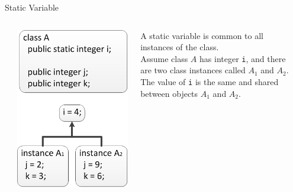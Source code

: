 \documentclass[aspectratio=169]{beamer}
\begin{document}
\begin{frame}{Static Variable}
\begin{columns}
\begin{column}{0.05\textwidth}
\end{column}
\begin{column}{0.35\textwidth}
\includegraphics[height=0.8\textheight]{img/A1A2.png}
\end{column}
\begin{column}{0.55\textwidth}
A static variable is common to all instances of the class. \\
\vspace{1em}
Assume class $A$ has integer \texttt{i}, and there are two class instances called $A_{1}$ and $A_{2}$. \\
\vspace{1em}
The value of \texttt{i} is the same and shared between objects $A_{1}$ and $A_{2}$. \\
\end{column}
\begin{column}{0.05\textwidth}
\end{column}
\end{columns}
\end{frame}
\end{document}
